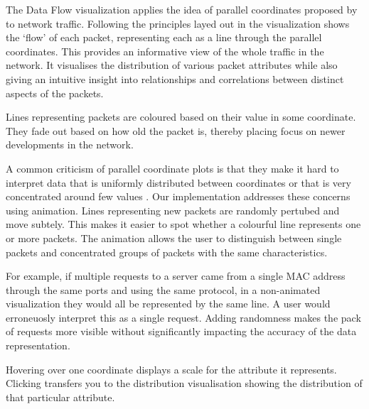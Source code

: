 The Data Flow visualization applies the idea of parallel coordinates proposed by \cite{inselberg1985plane} to network traffic. Following the principles layed out in \cite{fliggnetwork} the visualization shows the `flow' of each packet, representing each as a line through the parallel coordinates. This provides an informative view of the whole traffic in the network. It visualises the distribution of various packet attributes while also giving an intuitive insight into relationships and correlations between distinct aspects of the packets.

Lines representing packets are coloured based on their value in some coordinate. They fade out based on how old the packet is, thereby placing focus on newer developments in the network. 

A common criticism of parallel coordinate plots is that they make it hard to interpret data that is uniformly distributed between coordinates or that is very concentrated around few values \cite{marty2009applied}. Our implementation addresses these concerns using animation. Lines representing new packets are randomly pertubed and move subtely. This makes it easier to spot whether a colourful line represents one or more packets. The animation allows the user to distinguish between single packets and concentrated groups of packets with the same characteristics.

For example, if multiple requests to a server came from a single MAC address through the same ports and using the same protocol, in a non-animated visualization they would all be represented by the same line. A user would erroneuosly interpret this as a single request. Adding randomness makes the pack of requests more visible without significantly impacting the accuracy of the data representation.

Hovering over one coordinate displays a scale for the attribute it represents. Clicking transfers you to the distribution visualisation showing the distribution of that particular attribute.
